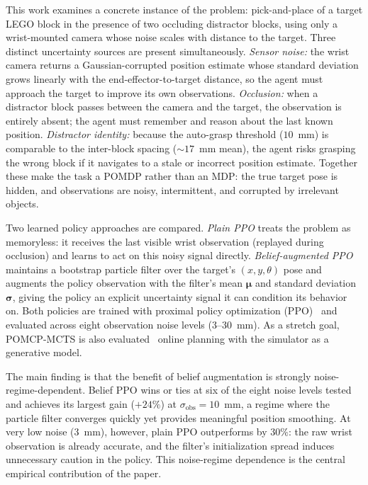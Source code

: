 \documentclass[conference]{IEEEtran}
\newcommand{\sigmaobs}{\sigma_{\text{obs}}}
\begin{document}
This work examines a concrete instance of the problem: pick-and-place of a
target LEGO block in the presence of two occluding distractor blocks, using
only a wrist-mounted camera whose noise scales with distance to the target.
Three distinct uncertainty sources are present simultaneously.
\emph{Sensor noise:} the wrist camera returns a Gaussian-corrupted position
estimate whose standard deviation grows linearly with the end-effector-to-target
distance, so the agent must approach the target to improve its own observations.
\emph{Occlusion:} when a distractor block passes between the camera and the
target, the observation is entirely absent; the agent must remember and reason
about the last known position.
\emph{Distractor identity:} because the auto-grasp threshold ($10$~mm) is
comparable to the inter-block spacing ($\sim\!17$~mm mean), the agent risks
grasping the wrong block if it navigates to a stale or incorrect position estimate.
Together these make the task a POMDP rather than an MDP: the true target
pose is hidden, and observations are noisy, intermittent, and corrupted by
irrelevant objects.

Two learned policy approaches are compared.
\emph{Plain PPO} treats the problem as memoryless: it receives the last visible
wrist observation (replayed during occlusion) and learns to act on this noisy
signal directly.
\emph{Belief-augmented PPO} maintains a bootstrap particle filter over the
target's $(x, y, \theta)$ pose and augments the policy observation with the
filter's mean $\bm{\mu}$ and standard deviation $\bm{\sigma}$, giving the
policy an explicit uncertainty signal it can condition its behavior on.
Both policies are trained with proximal policy optimization (PPO)~\cite{schulman2017ppo}
and evaluated across eight observation noise levels (3--30~mm).
As a stretch goal, POMCP-MCTS is also evaluated~\cite{silver2010pomcp} online
planning with the simulator as a generative model.

The main finding is that the benefit of belief augmentation is strongly
noise-regime-dependent.
Belief PPO wins or ties at six of the eight noise levels tested and achieves
its largest gain ($+24\%$) at $\sigmaobs = 10$~mm, a regime where the particle
filter converges quickly yet provides meaningful position smoothing.
At very low noise ($3$~mm), however, plain PPO outperforms by $30\%$:
the raw wrist observation is already accurate, and the filter's initialization
spread induces unnecessary caution in the policy.
This noise-regime dependence is the central empirical contribution of the paper.
\end{document}
